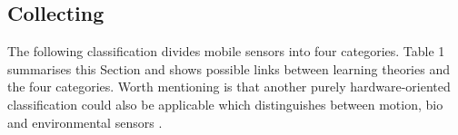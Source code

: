 \documentclass[runningheads]{llncs}
\begin{document}


\subsection{Collecting}

The following classification divides mobile sensors into four categories.
Table 1 summarises this Section and shows possible links between learning theories and the four categories.
Worth mentioning is that another purely hardware-oriented classification could also be applicable which distinguishes between motion, bio and environmental sensors \cite{hong_advances_2025}.

\end{document}

